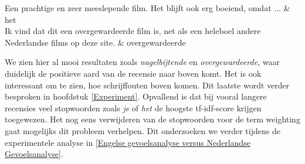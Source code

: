 \begin{table}[h]
\begin{tabu}
Een prachtige en zeer meeslepende film. Het blijft ook erg boeiend, omdat ... & het                                  \\ \hline
Ik vind dat dit een overgewardeerde film is, net als een heleboel andere Nederlandse films op deze site.                                                                                                                                                                                                                                                                                                                                                                                                                                                                                                                                                                                                                                                                                                                                                                                                                                                                                                                                                                                                                                                                                                                                                                                                                                                                                                                                                                                        & overgewardeerde                      \\ \hline
\end{tabu}
\caption{Enkele recensies met het woord met de hoogste tf-idf score}
\label{examples recensies}
\end{table}


We zien hier al mooi resultaten zoals \textit{nagelbijtende} en \textit{overgewardeerde}, waar duidelijk de positieve aard van de recensie naar boven komt. Het is ook interessant om te zien, hoe schrijffouten boven komen. Dit laatste wordt verder besproken in hoofdstuk \ref{Experiment}. Opvallend is dat bij vooral langere recensies veel stopwoorden zoals \textit{je} of \textit{het} de hoogste tf-idf-score krijgen toegewezen. Het nog eens verwijderen van de stopwoorden voor de term weighting gaat mogelijks dit probleem verhelpen. Dit onderzoeken we verder tijdens de experimentele analyse in \ref{Engelse gevoelsanalyse versus Nederlandse Gevoelsanalyse}. 


